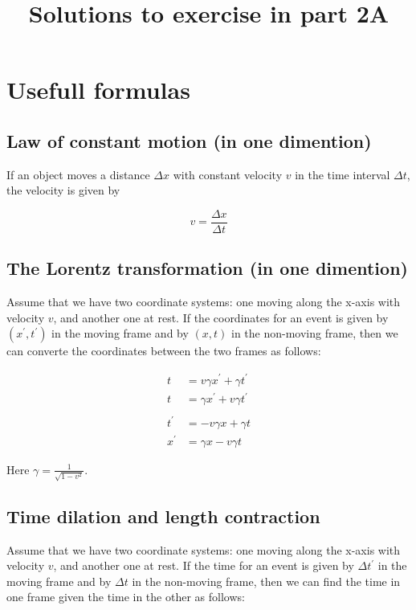 \documentclass[a4paper,10pt,english]{article}
\begin{document}
\title{Solutions to exercise in part 2A}
\date{}
\maketitle
\tableofcontents
\clearpage


\section*{Usefull formulas}
\subsection*{Law of constant motion (in one dimention)}
If an object moves a distance $\Delta x$ with constant velocity $v$ in the time interval $\Delta t$, the velocity is given by 

\begin{equation}\label{eq:const_mot}
v=\frac{\Delta x}{\Delta t}
\end{equation}


\subsection*{The Lorentz transformation (in one dimention)}
Assume that we have two coordinate systems: one moving along the x-axis with velocity $v$, and another one at rest. If the coordinates for an event is given by $(x^{\prime},t^{\prime})$ in the moving frame and by $(x,t)$ in the non-moving frame, then we can converte the coordinates between the two frames as follows:

\begin{align}
t&=v\gamma x^{\prime}+\gamma t^{\prime}\\
t&=\gamma x^{\prime}+v\gamma t^{\prime}\\ \nonumber\\
t^{\prime}&=-v\gamma x+\gamma t\\
x^{\prime}&=\gamma x-v\gamma t
\end{align}

Here $\gamma=\frac{1}{\sqrt{1-v^{2}}}$.


\subsection*{Time dilation and length contraction}
Assume that we have two coordinate systems: one moving along the x-axis with velocity $v$, and another one at rest. If the time for an event is given by $\Delta t^{\prime}$ in the moving frame and by $\Delta t$ in the non-moving frame, then we can find the time in one frame given the time in the other as follows:
\end{document}
